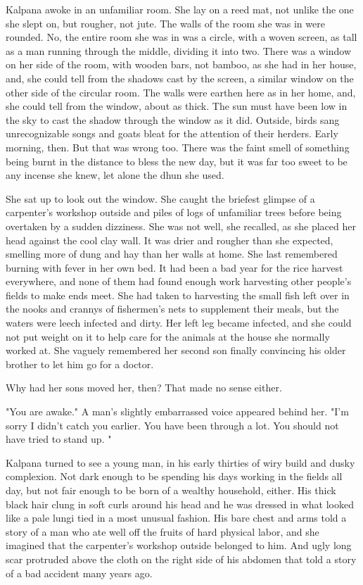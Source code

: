 \documentclass{amsart}
\begin{document}
	Kalpana awoke in an unfamiliar room. She lay on a reed mat, not unlike the one
	she slept on, but rougher, not jute. The walls of the room she was in were
	rounded. No, the entire room she was in was a circle, with a woven screen, as
	tall as a man running through the middle, dividing it into two. There was a
	window on her side of the room, with wooden bars, not bamboo, as she had in her
	house, and, she could tell from the shadows cast by the screen, a similar window
	on the other side of the circular room. The walls were earthen here as in her
	home, and, she could tell from the window, about as thick. The sun must have
	been low in the sky to cast the shadow through the window as it did. Outside,
	birds sang unrecognizable songs and goats bleat for the attention of their
	herders. Early morning, then. But that was wrong too. There was the faint smell
	of something being burnt in the distance to bless the new day, but it was far
	too sweet to be any incense she knew, let alone the dhun she used.
	
	She sat up to look out the window. She caught the briefest glimpse of a
	carpenter's workshop outside and piles of logs of unfamiliar trees before being
	overtaken by a sudden dizziness. She was not well, she recalled, as she placed
	her head against the cool clay wall. It was drier and rougher than she expected,
	smelling more of dung and hay than her walls at home. She last remembered
	burning with fever in her own bed. It had been a bad year for the rice harvest
	everywhere, and none of them had found enough work harvesting other people's
	fields to make ends meet. She had taken to harvesting the small fish left over
	in the nooks and crannys of fishermen's nets to supplement their meals, but the
	waters were leech infected and dirty. Her left leg became infected, and she
	could not put weight on it to help care for the animals at the house she
	normally worked at. She vaguely remembered her second son finally convincing his
	older brother to let him go for a doctor. 
	
	Why had her sons moved her, then? That made no sense either.
	
	"You are awake." A man's slightly embarrassed voice appeared behind her. "I'm
	sorry I didn't catch you earlier. You have been through a lot. You should not
	have tried to stand up. "
	
	Kalpana turned to see a young man, in his early thirties of wiry build and dusky
	complexion. Not dark enough to be spending his days working in the fields all
	day, but not fair enough to be born of a wealthy household, either. His thick
	black hair clung in soft curls around his head and he was dressed in what looked
	like a pale lungi tied in a most unusual fashion. His bare chest and arms told a
	story of a man who ate well off the fruits of hard physical labor, and she
	imagined that the carpenter's workshop outside belonged to him. And ugly long
	scar protruded above the cloth on the right side of his abdomen that told a
	story of a bad accident many years ago. 
	
\end{document}
